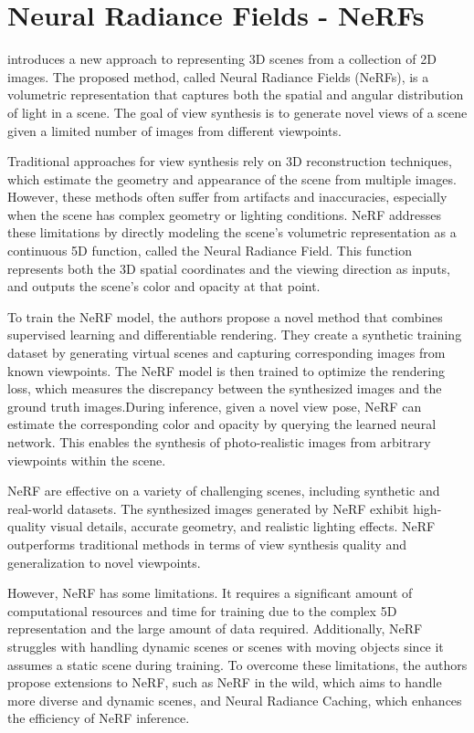 \section{Neural Radiance Fields - NeRFs}
\label{NeRF}

\cite{mildenhallNERF, tancikNerfstudio} 

\citeauthor{mildenhallNERF} introduces a new approach to representing 3D scenes from a collection of 2D images. The proposed method, called Neural Radiance Fields (NeRFs), is a volumetric representation that captures both the spatial and angular distribution of light in a scene. The goal of view synthesis is to generate novel views of a scene given a limited number of images from different viewpoints.

Traditional approaches for view synthesis rely on 3D reconstruction techniques, which estimate the geometry and appearance of the scene from multiple images. However, these methods often suffer from artifacts and inaccuracies, especially when the scene has complex geometry or lighting conditions. NeRF addresses these limitations by directly modeling the scene's volumetric representation as a continuous 5D function, called the Neural Radiance Field. This function represents both the 3D spatial coordinates and the viewing direction as inputs, and outputs the scene's color and opacity at that point.

To train the NeRF model, the authors propose a novel method that combines supervised learning and differentiable rendering. They create a synthetic training dataset by generating virtual scenes and capturing corresponding images from known viewpoints. The NeRF model is then trained to optimize the rendering loss, which measures the discrepancy between the synthesized images and the ground truth images.During inference, given a novel view pose, NeRF can estimate the corresponding color and opacity by querying the learned neural network. This enables the synthesis of photo-realistic images from arbitrary viewpoints within the scene.

NeRF are effective on a variety of challenging scenes, including synthetic and real-world datasets. The synthesized images generated by NeRF exhibit high-quality visual details, accurate geometry, and realistic lighting effects. NeRF outperforms traditional methods in terms of view synthesis quality and generalization to novel viewpoints.

However, NeRF has some limitations. It requires a significant amount of computational resources and time for training due to the complex 5D representation and the large amount of data required. Additionally, NeRF struggles with handling dynamic scenes or scenes with moving objects since it assumes a static scene during training. To overcome these limitations, the authors propose extensions to NeRF, such as NeRF in the wild, which aims to handle more diverse and dynamic scenes, and Neural Radiance Caching, which enhances the efficiency of NeRF inference.
